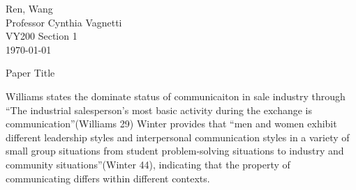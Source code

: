 \documentclass[12pt]{article}
\begin{document}
\begin{flushleft}

Ren, Wang\\
Professor Cynthia Vagnetti \\
VY200 Section 1\\
\today\\


\begin{center}
Paper Title
\end{center}


\setlength{\parindent}{0.5in}
Williams states the dominate status of communicaiton in sale industry through
``The industrial salesperson's most basic activity during the exchange is
communication''(Williams 29) Winter provides that ``men and women exhibit
different leadership styles and interpersonal communication styles in a variety
of small group situations from student problem-solving situations to industry
and community situations''(Winter 44), indicating that the property of communicating
differs within different contexts.





\end{flushleft}
\end{document}
